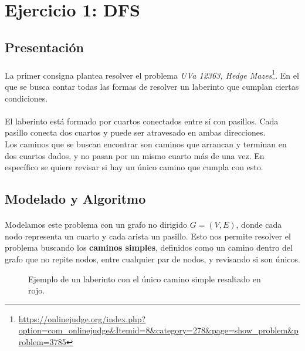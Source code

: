 \documentclass[../main.tex]{subfiles}
\begin{document}
\section{Ejercicio 1: DFS}
\label{sec:ej1}

\subsection{Presentación}
\label{sec:ej1-intro}
\paragraph{} La primer consigna plantea resolver el problema \textit{UVa 12363, Hedge Mazes}\footnote{\url{https://onlinejudge.org/index.php?option=com_onlinejudge&Itemid=8&category=278&page=show_problem&problem=3785}}. En el que se busca contar todas las formas de resolver un laberinto que cumplan ciertas condiciones.

\paragraph{} El laberinto está formado por cuartos conectados entre sí con pasillos. Cada pasillo conecta dos cuartos y puede ser atravesado en ambas direcciones. \\
Los caminos que se buscan encontrar son caminos que arrancan y terminan en dos cuartos dados, y no pasan por un mismo cuarto más de una vez. En específico se quiere revisar si hay un único camino que cumpla con esto.

\subsection{Modelado y Algoritmo}
\label{sec:ej1-modeling}
\paragraph{} Modelamos este problema con un grafo no dirigido \(G = (V, E)\), donde cada nodo representa un cuarto y cada arista un pasillo. Esto nos permite resolver el problema buscando los \textbf{caminos simples}, definidos como un camino dentro del grafo que no repite nodos, entre cualquier par de nodos, y revisando si son únicos.

\begin{figure}[H]
\centering

  
\caption{Ejemplo de un laberinto con el único camino simple resaltado en rojo.}
\label{fig:ej1-ex}
\end{figure}
\end{document}
